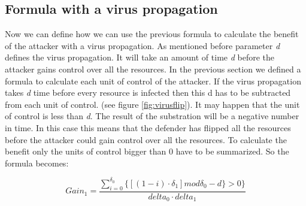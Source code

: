 \subsection{Formula with a virus propagation}
Now we can define how we can use the previous formula to calculate the benefit of the attacker with a virus propagation.
As mentioned before parameter \textit{d} defines the virus propagation. It will take an amount of time \textit{d} before the attacker gains control over all the resources. In the previous section we defined a formula to calculate each unit of control of the attacker. If the virus propagation takes \textit{d} time before every resource is infected then this d has to be subtracted from each unit of control. (see figure \ref{fig:virusflip}). It may happen that the unit of control is less than \textit{d}. The result of the substration will be a negative number in time. In this case this means that the defender has flipped all the resources before the attacker could gain control over all the resources. To calculate the benefit only the units of control bigger than 0 have to be summarized. So the formula becomes:

\begin{equation}\label{first}
Gain_{1} = \dfrac{\sum_{i=0}^{\delta_{0}} \lbrace [( 1 - i ) \cdot \delta_{1}] mod \delta_{0} - d \rbrace  > 0 \rbrace }{delta_{0} \cdot delta_{1}} 
\end{equation}

%
%





